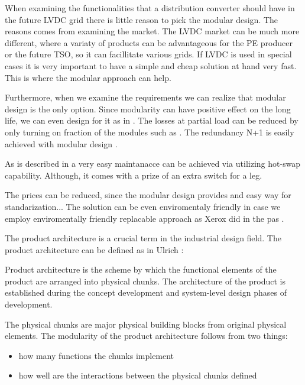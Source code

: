 \documentclass[]{scrartcl}
\newenvironment{definition}[1][Definition]{\begin{trivlist}
		\item[\hskip \labelsep {\bfseries #1}]}{\end{trivlist}}
\begin{document}
When examining the functionalities that a distribution converter should have in the future LVDC grid there is little reason to pick the modular design. The reasons comes from examining the market. The LVDC market can be much more different, where a variaty of products can be advantageous for the PE producer or the future TSO, so it can facillitate various grids. If LVDC is used in special cases it is very important to have a simple and cheap solution at hand very fast. This is where the modular approach can help. 

Furthermore, when we examine the requirements we can realize that modular design is the only option. Since modularity can have positive effect on the long life, we can even design for it as in \cite{Newcomb1996}. The losses at partial load can be reduced by only turning on fraction of the modules such as \cite{Liserre2016a}. The redundancy N+1 is easily achieved with modular design \cite{Doncker2014}. 

As is described in \cite{Cottet2015} a very easy maintanacce can be achieved via utilizing hot-swap capability. Although, it comes with a prize of an extra switch for a leg. 

The prices can be reduced, since the modular design provides and easy way for standarization... The solution can be even enviromentaly friendly in case we employ enviromentally friendly replacable approach as Xerox did in the pas \cite{Ulrich2004}.



The product architecture is a crucial term in the industrial design field. The product architecture can be defined as in Ulrich \cite{Ulrich2004}:
	\begin{definition}
	Product architecture is the scheme by which the functional elements of the product are arranged into physical chunks. The architecture of the product is established during the concept development and system-level design phases of development. 
	\end{definition}
	
	The physical chunks are major physical building blocks from original physical elements. The modularity of the product architecture follows from two things:
	\begin{itemize}
	\item how many functions the chunks implement
	\item how well are the interactions between the physical chunks defined
	\end{itemize}
		
\end{document}
